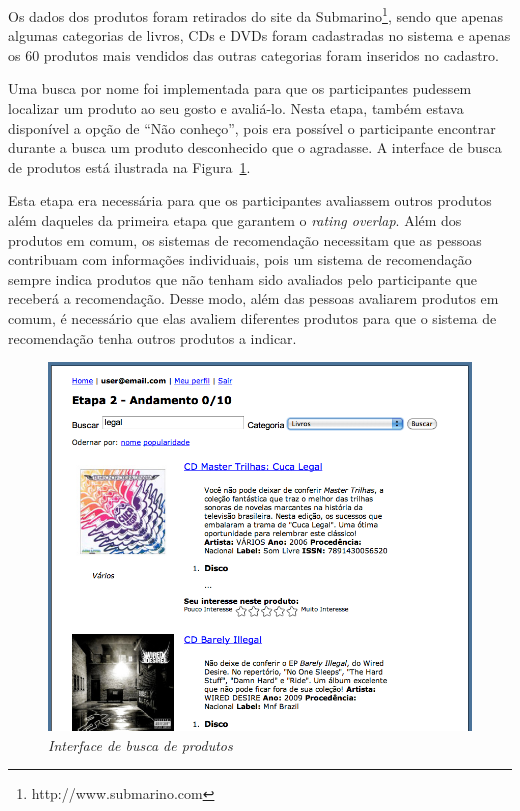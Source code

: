 Os dados dos produtos foram retirados do site da Submarino\footnote{http://www.submarino.com}, sendo que apenas algumas categorias de livros, CDs e DVDs foram cadastradas no sistema e apenas os 60 produtos mais vendidos das outras categorias foram inseridos no cadastro.

Uma busca por nome foi implementada para que os participantes pudessem localizar um produto ao seu gosto e avaliá-lo. Nesta etapa, também estava disponível a opção de ``Não conheço'', pois era possível o participante encontrar durante a busca um produto desconhecido que o agradasse. A interface de busca de produtos está ilustrada na Figura~\ref{fig:product-search}.

Esta etapa era necessária para que os participantes avaliassem outros produtos além daqueles da primeira etapa que garantem o \textit{rating overlap}. Além dos produtos em comum, os sistemas de recomendação necessitam que as pessoas contribuam com informações individuais, pois um sistema de recomendação sempre indica produtos que não tenham sido avaliados pelo participante que receberá a recomendação. Desse modo, além das pessoas avaliarem produtos em comum, é necessário que elas avaliem diferentes produtos para que o sistema de recomendação tenha outros produtos a indicar.

\begin{figure}[htp]
  \centering
  \includegraphics[width=\textwidth]{imagens/search}
  \caption{\it Interface de busca de produtos}
  \label{fig:product-search}
\end{figure}


